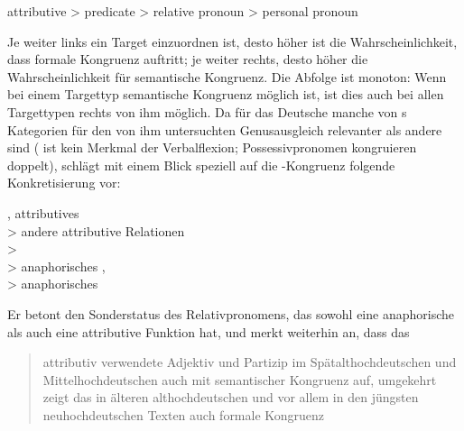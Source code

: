 \begin{exe}
\ex attributive > predicate > relative pronoun > personal pronoun
\end{exe}

Je weiter links ein Target einzuordnen ist, desto höher ist die
Wahrscheinlichkeit, dass formale Kongruenz auftritt; je weiter rechts, desto
höher die Wahrscheinlichkeit für semantische Kongruenz. Die Abfolge ist
monoton: Wenn bei einem Targettyp semantische Kongruenz möglich ist, ist dies
auch bei allen Targettypen rechts von ihm möglich. Da für das
Deutsche manche von \citeauthor{corbett1979}s Kategorien für
den von ihm untersuchten Genusausgleich relevanter als andere sind (
ist kein Merkmal der Verbalflexion; Possessivpronomen kongruieren doppelt),
schlägt \citet[193]{fleischer2012} mit einem Blick speziell auf die
-Kongruenz folgende Konkretisierung vor:

\begin{exe}
\ex {}, attributives  \\
	\hspace*{1em} > andere attributive Relationen \\
	\hspace*{2em} >  \\
	\hspace*{3em} > anaphorisches ,
		 \\
	\hspace*{4em} > anaphorisches 
\end{exe}

Er betont den Sonderstatus des Relativpronomens, das sowohl
eine anaphorische als auch eine attributive Funktion
hat, und merkt weiterhin an, dass das
\blockcquote[194]{fleischer2012}{attributiv verwendete
Adjektiv und Partizip \textelp{} im
Spätalthochdeutschen und
Mittelhochdeutschen auch mit semantischer Kongruenz
auf, umgekehrt zeigt das  in älteren
althochdeutschen und vor allem in den jüngsten
neuhochdeutschen Texten auch formale Kongruenz}.

